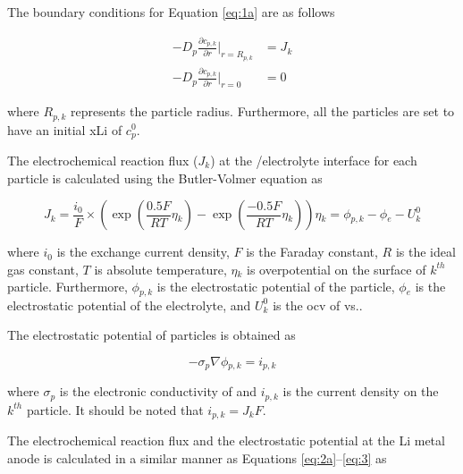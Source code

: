 \documentclass{article}
\begin{document}
The boundary conditions for Equation \ref{eq:1a} are as
follows\cite{newman1993,newman1994}

\begin{subequations}
    \begin{align}
      -D_p\frac{\partial c_{p,k}}{\partial r}|_{r=R_{p,k}} &= J_{k} \label{eq:1b} \\
      -D_p\frac{\partial c_{p,k}}{\partial r}|_{r=0} &= 0 \label{eq:1c}
    \end{align}
\end{subequations}

where $R_{p,k}$ represents the particle radius. Furthermore, all the
particles are set to have an initial \gls{xLi} of $c_p^0$.

The electrochemical reaction flux ($J_k$) at the \nca{}/electrolyte
interface for each particle is calculated using the Butler-Volmer
equation as\cite{newman1993,newman1994}

\begin{subequations}
\begin{equation}
  J_k = \frac{i_0}{F}\times\left(\exp \left(\frac{0.5F}{RT}\eta{}_k\right)-\exp
  \left(\frac{-0.5F}{RT}\eta{}_k\right)\right)
  \label{eq:2a}
\end{equation}
\begin{equation}
  \eta{}_k=\phi{}_{p,k}-\phi{}_e-U_k^0
  \label{eq:2b}
\end{equation}
\end{subequations}

where $i_0$ is the exchange current density, $F$ is the Faraday
constant, $R$ is the ideal gas constant, $T$ is absolute temperature,
$\eta{}_k$ is overpotential on the surface of $k^{\mathit{th}}$
particle. Furthermore, $\phi{}_{p,k}$ is the electrostatic potential of the
particle, $\phi{}_e$ is the electrostatic potential of the electrolyte, and
$U_k^0$ is the \gls{ocv} of \nca{} vs..

The electrostatic potential of \nca{} particles is obtained as\cite{newman1993,newman1994}

\begin{equation}
  -\sigma{}_p\nabla{}\phi{}_{p,k}=i_{p,k}
  \label{eq:3}
\end{equation}

where $\sigma{}_p$ is the electronic conductivity of \nca{} and $i_{p,k}$ is
the current density on the $k^{\mathit{th}}$ particle. It should be
noted that $i_{p,k}=J_kF$.

The electrochemical reaction flux and the electrostatic potential at
the Li metal anode is calculated in a similar manner as Equations
\ref{eq:2a}--\ref{eq:3} as\cite{dasgupta2016}
\end{document}
